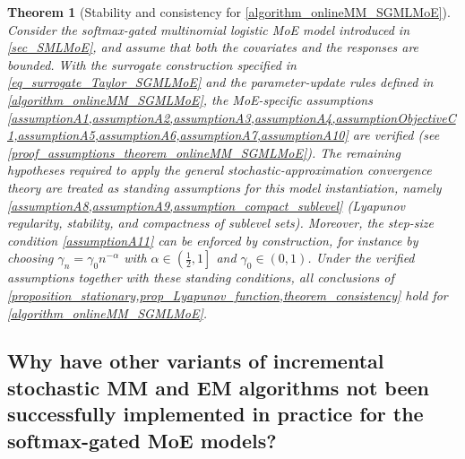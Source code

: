 \documentclass{article}
\newcommand{\md}{softmax-gated MoE }
\newtheorem{theorem}{Theorem}
\begin{document}
\begin{theorem}[Stability and consistency for \cref{algorithm_onlineMM_SGMLMoE}]
\label{theorem_onlineMM_SGMLMoE}
Consider the softmax-gated multinomial logistic MoE model introduced in
\cref{sec_SMLMoE}, and assume that both the covariates and the responses are
bounded.
With the surrogate construction specified in
\cref{eq_surrogate_Taylor_SGMLMoE} and the parameter-update rules defined in
\cref{algorithm_onlineMM_SGMLMoE}, the MoE-specific assumptions
\cref{assumptionA1,assumptionA2,assumptionA3,assumptionA4,assumptionObjectiveC1,assumptionA5,assumptionA6,assumptionA7,assumptionA10}
are verified (see \cref{proof_assumptions_theorem_onlineMM_SGMLMoE}).
The remaining hypotheses required to apply the general stochastic-approximation
convergence theory are treated as standing assumptions for this model
instantiation, namely
\cref{assumptionA8,assumptionA9,assumption_compact_sublevel}
(Lyapunov regularity, stability, and compactness of sublevel sets).
Moreover, the step-size condition \cref{assumptionA11} can be enforced by
construction, for instance by choosing $\gamma_n=\gamma_0 n^{-\alpha}$ with
$\alpha\in\left(\tfrac12,1\right]$ and $\gamma_0\in(0,1)$.
Under the verified assumptions together with these standing conditions, all
conclusions of
\cref{proposition_stationary,prop_Lyapunov_function,theorem_consistency}
hold for \cref{algorithm_onlineMM_SGMLMoE}.
\end{theorem}




\subsection{Why have other variants of incremental stochastic MM and EM algorithms not been successfully implemented in practice for the \md models?}\label{sec_why_fails_MM_EM}
\end{document}
